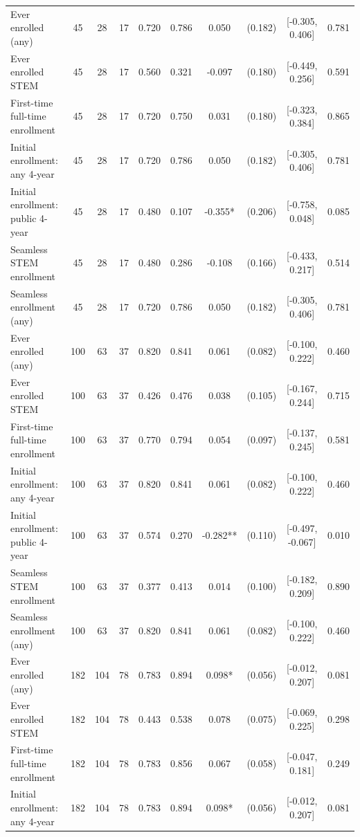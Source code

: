 \begin{table}[t]
\begin{tabular*}{\linewidth}{@{\extracolsep{\fill}}l|ccccccccc}
\midrule\addlinespace[2.5pt]
Ever enrolled (any) & 45 & 28 & 17 & 0.720 & 0.786 & 0.050 & (0.182) & [-0.305, 0.406] & 0.781 \\ 
Ever enrolled STEM & 45 & 28 & 17 & 0.560 & 0.321 & -0.097 & (0.180) & [-0.449, 0.256] & 0.591 \\ 
First-time full-time enrollment & 45 & 28 & 17 & 0.720 & 0.750 & 0.031 & (0.180) & [-0.323, 0.384] & 0.865 \\ 
Initial enrollment: any 4-year & 45 & 28 & 17 & 0.720 & 0.786 & 0.050 & (0.182) & [-0.305, 0.406] & 0.781 \\ 
Initial enrollment: public 4-year & 45 & 28 & 17 & 0.480 & 0.107 & -0.355* & (0.206) & [-0.758, 0.048] & 0.085 \\ 
Seamless STEM enrollment & 45 & 28 & 17 & 0.480 & 0.286 & -0.108 & (0.166) & [-0.433, 0.217] & 0.514 \\ 
Seamless enrollment (any) & 45 & 28 & 17 & 0.720 & 0.786 & 0.050 & (0.182) & [-0.305, 0.406] & 0.781 \\ 
Ever enrolled (any) & 100 & 63 & 37 & 0.820 & 0.841 & 0.061 & (0.082) & [-0.100, 0.222] & 0.460 \\ 
Ever enrolled STEM & 100 & 63 & 37 & 0.426 & 0.476 & 0.038 & (0.105) & [-0.167, 0.244] & 0.715 \\ 
First-time full-time enrollment & 100 & 63 & 37 & 0.770 & 0.794 & 0.054 & (0.097) & [-0.137, 0.245] & 0.581 \\ 
Initial enrollment: any 4-year & 100 & 63 & 37 & 0.820 & 0.841 & 0.061 & (0.082) & [-0.100, 0.222] & 0.460 \\ 
Initial enrollment: public 4-year & 100 & 63 & 37 & 0.574 & 0.270 & -0.282** & (0.110) & [-0.497, -0.067] & 0.010 \\ 
Seamless STEM enrollment & 100 & 63 & 37 & 0.377 & 0.413 & 0.014 & (0.100) & [-0.182, 0.209] & 0.890 \\ 
Seamless enrollment (any) & 100 & 63 & 37 & 0.820 & 0.841 & 0.061 & (0.082) & [-0.100, 0.222] & 0.460 \\ 
Ever enrolled (any) & 182 & 104 & 78 & 0.783 & 0.894 & 0.098* & (0.056) & [-0.012, 0.207] & 0.081 \\ 
Ever enrolled STEM & 182 & 104 & 78 & 0.443 & 0.538 & 0.078 & (0.075) & [-0.069, 0.225] & 0.298 \\ 
First-time full-time enrollment & 182 & 104 & 78 & 0.783 & 0.856 & 0.067 & (0.058) & [-0.047, 0.181] & 0.249 \\ 
Initial enrollment: any 4-year & 182 & 104 & 78 & 0.783 & 0.894 & 0.098* & (0.056) & [-0.012, 0.207] & 0.081 \\ 

\end{tabular*}
\end{table}
